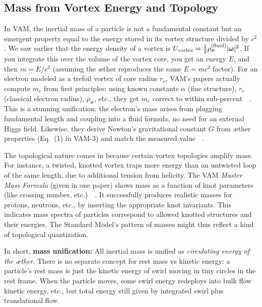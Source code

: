 \documentclass[a4paper,12pt]{article}
\begin{document}
    \subsection{Mass from Vortex Energy and Topology}
    In VAM, the inertial mass of a particle is not a fundamental constant but an emergent property equal to the energy stored in its vortex structure divided by $c^2$. We saw earlier that the energy density of a vortex is $U_{\rm vortex} = \frac{1}{2}\rho_{\text{\ae}}^{(\text{fluid})}|\boldsymbol{\omega}|^2$. If you integrate this over the volume of the vortex core, you get an energy $E$, and then $m = E/c^2$ (assuming the æther reproduces the same $E=mc^2$ factor). For an electron modeled as a trefoil vortex of core radius $r_c$, VAM’s papers actually compute $m_e$ from first principles: using known constants $\alpha$ (fine structure), $r_c$ (classical electron radius), $\rho_{\text{\ae}}$, etc., they get $m_e$ correct to within sub-percent~\cite{reference_139}~\cite{reference_140}. This is a stunning unification: the electron’s mass arises from plugging fundamental length and coupling into a fluid formula, no need for an external Higgs field. Likewise, they derive Newton’s gravitational constant $G$ from æther properties (Eq.~(1) in VAM-3) and match the measured value~\cite{reference_141}~\cite{reference_142}.

    The topological nature comes in because certain vortex topologies amplify mass. For instance, a twisted, knotted vortex traps more energy than an untwisted loop of the same length, due to additional tension from helicity. The VAM \emph{Master Mass Formula} (given in one paper) shows mass as a function of knot parameters (like crossing number, etc.)~\cite{reference_143}~\cite{reference_144}. It successfully produces realistic masses for protons, neutrons, etc., by inserting the appropriate knot invariants. This indicates mass spectra of particles correspond to allowed knotted structures and their energies. The Standard Model’s pattern of masses might thus reflect a kind of topological quantization.

    In short, \textbf{mass unification:} All inertial mass is unified as \emph{circulating energy of the æther}. There is no separate concept for rest mass vs kinetic energy: a particle’s rest mass is just the kinetic energy of swirl moving in tiny circles in the rest frame. When the particle moves, some swirl energy redeploys into bulk flow kinetic energy, etc., but total energy still given by integrated swirl plus translational flow.
\end{document}
